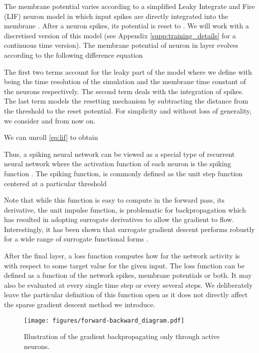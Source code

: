 \documentclass{article}
\begin{document}
The membrane potential varies according to a simplified Leaky Integrate and Fire (LIF) neuron model in which input spikes are directly integrated into the membrane \cite{gerstner2014neuronal}. After a neuron spikes, its potential is reset to . We will work with a discretised version of this model (see Appendix \ref{supp:training_details} for a continuous time version). The membrane potential of neuron  in layer  evolves according to the following difference equation





The first two terms account for the leaky part of the model where we define  with  being the time resolution of the simulation and the membrane time constant of the neurons respectively. The second term deals with the integration of spikes. The last term models the resetting mechanism by subtracting the distance from the threshold to the reset potential. For simplicity and without loss of generality, we consider  and  from now on. 

We can unroll \eqref{eq:lif} to obtain

\vspace{-0.4cm}


Thus, a spiking neural network can be viewed as a special type of recurrent neural network where the activation function of each neuron is the spiking function . The spiking function, is commonly defined as the unit step function centered at a particular threshold 


Note that while this function is easy to compute in the forward pass, its derivative, the unit impulse function, is problematic for backpropagation which has resulted in adopting surrogate derivatives \cite{SuGD_zenke} to allow the gradient to flow. Interestingly, it has been shown that surrogate gradient descent performs robustly for a wide range of surrogate functional forms \cite{zenke2021remarkable}.

After the final layer, a loss function  computes how far the network activity is with respect to some target value for the given input. The loss function can be defined as a function of the network spikes, membrane potentials or both. It may also be evaluated at every single time step or every several steps. We deliberately leave the particular definition of this function open as it does not directly affect the sparse gradient descent method we introduce.


\begin{figure}[!tb]
\centering
\texttt{[image: figures/forward-backward\_diagram.pdf]}
\caption{Illustration of the gradient backpropagating only through active neurons.}
\label{fig:forward_backward}
\vspace{-0.5cm}
\end{figure}
\end{document}
